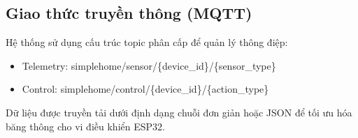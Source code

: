 \subsection{Giao thức truyền thông (MQTT)}
Hệ thống sử dụng cấu trúc topic phân cấp để quản lý thông điệp:
\begin{itemize}
    \item Telemetry: simplehome/sensor/\{device\_id\}/\{sensor\_type\}
    \item Control: simplehome/control/\{device\_id\}/\{action\_type\}
\end{itemize}
Dữ liệu được truyền tải dưới định dạng chuỗi đơn giản hoặc JSON để tối ưu hóa băng thông cho vi điều khiển ESP32.
